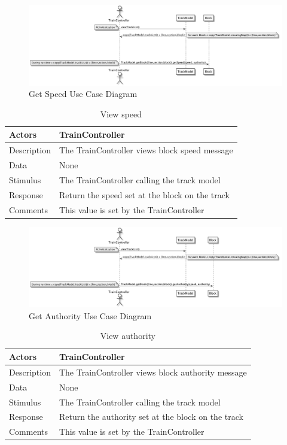 \documentclass[]{article}
\begin{document}
\begin{figure}[H]
	\centering
	\includegraphics[scale=.5]{getSpeed.png}
	\caption{Get Speed Use Case Diagram}
\end{figure}

\begin{table}[H]
	\centering
	\caption{View speed}
	\begin{tabular}{|l|l|}
		\hline
		Actors & \parbox[t]{10cm}{TrainController} \\ \hline
		Description & \parbox[t]{10cm}{The TrainController views block speed message} \\ \hline
		Data &  \parbox[t]{10cm}{None} \\ \hline
		Stimulus &  \parbox[t]{10cm}{The TrainController calling the track model} \\ \hline
		Response & \parbox[t]{10cm}{Return the speed set at the block on the track}\\ \hline
		Comments & \parbox[t]{10cm}{This value is set by the TrainController}  \\ \hline
	\end{tabular}
\end{table}

\begin{figure}[H]
	\centering
	\includegraphics[scale=.5]{getAuthority.png}
	\caption{Get Authority Use Case Diagram}
\end{figure}
\begin{table}[H]
	\centering
	\caption{View authority}
	\begin{tabular}{|l|l|}
		\hline
		Actors & \parbox[t]{10cm}{TrainController} \\ \hline
		Description & \parbox[t]{10cm}{The TrainController views block authority message} \\ \hline
		Data &  \parbox[t]{10cm}{None} \\ \hline
		Stimulus &  \parbox[t]{10cm}{The TrainController calling the track model} \\ \hline
		Response & \parbox[t]{10cm}{Return the authority set at the block on the track}\\ \hline
		Comments & \parbox[t]{10cm}{This value is set by the TrainController}  \\ \hline
	\end{tabular}
\end{table}
\end{document}
